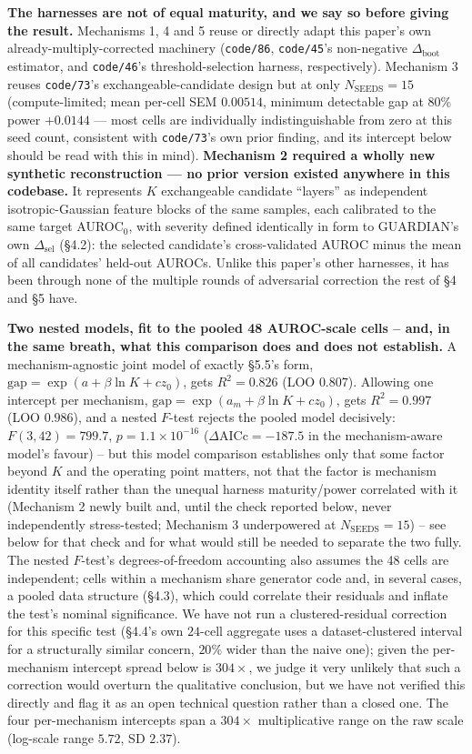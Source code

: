 \documentclass[10pt]{article} %
\begin{document}
\textbf{The harnesses are not of equal maturity, and we say so before giving
the result.} Mechanisms 1, 4 and 5 reuse or directly adapt this paper's own
already-multiply-corrected machinery (\texttt{code/86}, \texttt{code/45}'s
non-negative $\Delta_{\text{boot}}$ estimator, and \texttt{code/46}'s
threshold-selection harness, respectively). Mechanism 3 reuses
\texttt{code/73}'s exchangeable-candidate design but at only $N_{\text{SEEDS}}=15$
(compute-limited; mean per-cell SEM $0.00514$, minimum detectable gap at
80\% power $+0.0144$ --- most cells are individually indistinguishable from
zero at this seed count, consistent with \texttt{code/73}'s own prior
finding, and its intercept below should be read with this in mind).
\textbf{Mechanism 2 required a wholly new synthetic reconstruction --- no
prior version existed anywhere in this codebase.} It represents $K$
exchangeable candidate ``layers'' as independent isotropic-Gaussian feature
blocks of the same samples, each calibrated to the same target AUROC$_0$,
with severity defined identically in form to GUARDIAN's own
$\Delta_{\text{sel}}$ (§4.2): the selected candidate's cross-validated AUROC
minus the mean of all candidates' held-out AUROCs. Unlike this paper's other
harnesses, it has been through none of the multiple rounds of adversarial
correction the rest of §4 and §5 have.

\textbf{Two nested models, fit to the pooled 48 AUROC-scale cells --
and, in the same breath, what this comparison does and does not
establish.} A mechanism-agnostic joint model of exactly §5.5's form,
$\text{gap}=\exp(a+\beta\ln K+cz_0)$, gets $R^2=0.826$ (LOO $0.807$). Allowing
one intercept per mechanism, $\text{gap}=\exp(a_m+\beta\ln K+cz_0)$, gets
$R^2=0.997$ (LOO $\mathbf{0.986}$), and a nested $F$-test rejects the pooled
model decisively: $F(3,42)=799.7$, $p=1.1\times10^{-16}$ ($\Delta\text{AICc}=-187.5$
in the mechanism-aware model's favour) -- but this model comparison
establishes only that some factor beyond $K$ and the operating point
matters, not that the factor is mechanism identity itself rather than the
unequal harness maturity/power correlated with it (Mechanism 2 newly
built and, until the check reported below, never independently
stress-tested; Mechanism 3 underpowered at $N_{\text{SEEDS}}=15$) -- see
below for that check and for what would still be needed to separate the
two fully. The nested $F$-test's degrees-of-freedom accounting also
assumes the 48 cells are independent; cells within a mechanism share
generator code and, in several cases, a pooled data structure (§4.3), which
could correlate their residuals and inflate the test's nominal
significance. We have not run a clustered-residual correction for this
specific test (§4.4's own $24$-cell aggregate uses a dataset-clustered
interval for a structurally similar concern, $20\%$ wider than the naive
one); given the per-mechanism intercept spread below is $304\times$, we
judge it very unlikely that such a correction would overturn the
qualitative conclusion, but we have not verified this directly and flag it
as an open technical question rather than a closed one. The four per-mechanism intercepts
span a $304\times$ multiplicative range on the raw scale (log-scale range
$5.72$, SD $2.37$).
\end{document}
